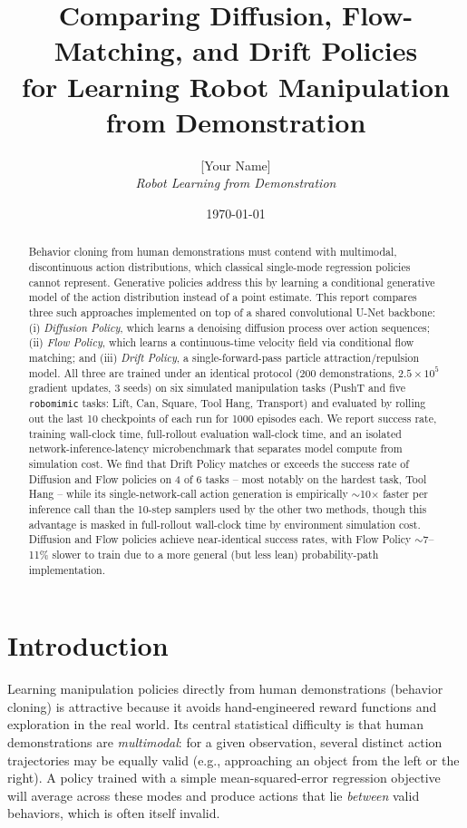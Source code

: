 \documentclass[11pt]{article}
\title{Comparing Diffusion, Flow-Matching, and Drift Policies\\
for Learning Robot Manipulation from Demonstration}
\author{[Your Name]\\ \textit{Robot Learning from Demonstration}}
\date{\today}
\begin{document}
\maketitle

\begin{abstract}
Behavior cloning from human demonstrations must contend with multimodal,
discontinuous action distributions, which classical single-mode regression
policies cannot represent. Generative policies address this by learning a
conditional generative model of the action distribution instead of a point
estimate. This report compares three such approaches implemented on top of a
shared convolutional U-Net backbone: (i) \emph{Diffusion Policy}, which learns
a denoising diffusion process over action sequences; (ii) \emph{Flow Policy},
which learns a continuous-time velocity field via conditional flow matching;
and (iii) \emph{Drift Policy}, a single-forward-pass particle
attraction/repulsion model. All three are trained under an identical protocol
(200 demonstrations, $2.5\times10^{5}$ gradient updates, 3 seeds) on six
simulated manipulation tasks (PushT and five \texttt{robomimic} tasks: Lift,
Can, Square, Tool Hang, Transport) and evaluated by rolling out the last 10
checkpoints of each run for 1000 episodes each. We report success rate,
training wall-clock time, full-rollout evaluation wall-clock time, and an
isolated network-inference-latency microbenchmark that separates model
compute from simulation cost. We find that Drift Policy matches or exceeds
the success rate of Diffusion and Flow policies on 4 of 6 tasks -- most
notably on the hardest task, Tool Hang -- while its single-network-call
action generation is empirically $\sim$10$\times$ faster per inference call
than the 10-step samplers used by the other two methods, though this
advantage is masked in full-rollout wall-clock time by environment
simulation cost. Diffusion and Flow policies achieve near-identical success
rates, with Flow Policy $\sim$7--11\% slower to train due to a more general
(but less lean) probability-path implementation.
\end{abstract}

\section{Introduction}

Learning manipulation policies directly from human demonstrations
(behavior cloning) is attractive because it avoids hand-engineered reward
functions and exploration in the real world. Its central statistical
difficulty is that human demonstrations are \emph{multimodal}: for a given
observation, several distinct action trajectories may be equally valid (e.g.,
approaching an object from the left or the right). A policy trained with a
simple mean-squared-error regression objective will average across these
modes and produce actions that lie \emph{between} valid behaviors, which is
often itself invalid.
\end{document}
